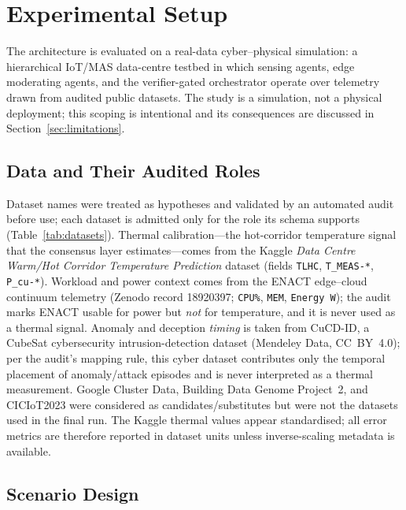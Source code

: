 \section{Experimental Setup}
\label{sec:setup}

The architecture is evaluated on a real-data cyber--physical simulation:
a hierarchical IoT/MAS data-centre testbed in which sensing agents,
edge moderating agents, and the verifier-gated orchestrator operate over
telemetry drawn from audited public datasets. The study is a
simulation, not a physical deployment; this scoping is intentional and
its consequences are discussed in Section~\ref{sec:limitations}.

\subsection{Data and Their Audited Roles}
\label{sec:setup_data}

Dataset names were treated as hypotheses and validated by an automated
audit before use; each dataset is admitted only for the role its schema
supports (Table~\ref{tab:datasets}). Thermal calibration---the
hot-corridor temperature signal that the consensus layer
estimates---comes from the Kaggle \emph{Data Centre Warm/Hot Corridor
Temperature Prediction} dataset (fields \texttt{TLHC},
\texttt{T\_MEAS-*}, \texttt{P\_cu-*}). Workload and power context comes
from the ENACT edge--cloud continuum telemetry (Zenodo record
18920397; \texttt{CPU\%}, \texttt{MEM}, \texttt{Energy\,W}); the audit
marks ENACT usable for power but \emph{not} for temperature, and it is
never used as a thermal signal. Anomaly and deception \emph{timing} is
taken from CuCD-ID, a CubeSat cybersecurity intrusion-detection dataset
(Mendeley Data, CC~BY~4.0); per the audit's mapping rule, this
cyber dataset contributes only the temporal placement of
anomaly/attack episodes and is never interpreted as a thermal
measurement. Google Cluster Data, Building Data Genome Project~2, and
CICIoT2023 were considered as candidates/substitutes but were not the
datasets used in the final run. The Kaggle thermal values appear
standardised; all error metrics are therefore reported in dataset units
unless inverse-scaling metadata is available.



\subsection{Scenario Design}
\label{sec:setup_scenarios}

